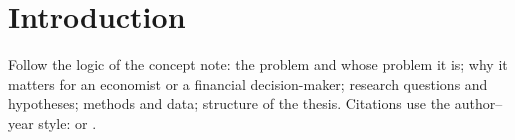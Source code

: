\chapter{Introduction}

Follow the logic of the concept note: the problem and whose problem it is; why it matters for an economist or a financial decision-maker; research questions and hypotheses; methods and data; structure of the thesis. Citations use the author--year style: \citet{bollerslev1986garch} or \citep{corsi2009har}.
